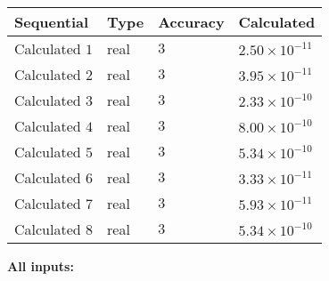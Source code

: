 \documentclass[12pt]{article}
\begin{document}
   
   
   
\noindent{}
   
   
  
  
\noindent\begin{tabular}{|l|l|l|l|}
\hline
 Sequential & Type & Accuracy & Calculated \\ 
\hline
 
 
  Calculated $           1$ & real & $           3 $ & 
 $ 2.50 \times 10^{-11} $ 
 \\  \hline  
 
 
  Calculated $           2$ & real & $           3 $ & 
 $ 3.95 \times 10^{-11} $ 
 \\  \hline  
 
 
  Calculated $           3$ & real & $           3 $ & 
 $ 2.33 \times 10^{-10} $ 
 \\  \hline  
 
 
  Calculated $           4$ & real & $           3 $ & 
 $ 8.00 \times 10^{-10} $ 
 \\  \hline  
 
 
  Calculated $           5$ & real & $           3 $ & 
 $ 5.34 \times 10^{-10} $ 
 \\  \hline  
 
 
  Calculated $           6$ & real & $           3 $ & 
 $ 3.33 \times 10^{-11} $ 
 \\  \hline  
 
 
  Calculated $           7$ & real & $           3 $ & 
 $ 5.93 \times 10^{-11} $ 
 \\  \hline  
 
 
  Calculated $           8$ & real & $           3 $ & 
 $ 5.34 \times 10^{-10} $ 
 \\  \hline  
 \end{tabular}
   
   
   
   
\noindent\vspace{0.1in}\hspace{-0.08in} {\textbf{\Large{All inputs: }}}
   
   
  
\end{document}
